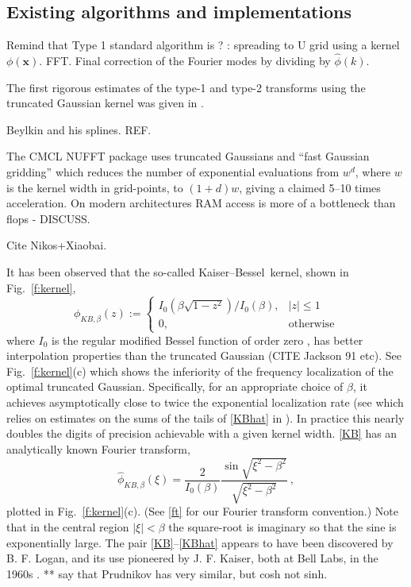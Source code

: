 \documentclass[10pt]{article}
\newcommand{\be}{\begin{equation}}
\newcommand{\ee}{\end{equation}}
\newcommand{\mbf}[1]{{\mathbf #1}}
\newcommand{\xx}{\mbf{x}}
\newcommand{\KB}{Kaiser--Bessel}
\newcommand{\freq}{\beta}          %
\begin{document}
\subsection{Existing algorithms and implementations}

Remind that Type 1 standard algorithm is ? :
spreading to U grid using a kernel $\phi(\xx)$.
FFT.
Final correction of the Fourier modes by dividing by
$\hat\phi(k)$.

The first rigorous estimates of the type-1 and type-2 transforms
using the truncated Gaussian kernel was given in \cite{dutt}.

Beylkin and his splines. REF.

The CMCL NUFFT package \cite{cmcl} uses truncated Gaussians
and ``fast Gaussian gridding'' \cite[Sec.~3]{nufft}
which reduces the number of exponential evaluations
from $w^d$, where $w$ is the kernel width in grid-points,
to $(1+d)w$, giving a claimed 5--10 times acceleration.
On modern architectures RAM access is more of a bottleneck than
flops - DISCUSS.

Cite Nikos+Xiaobai.

It has been observed that the so-called
\KB\ kernel, shown in Fig.~\ref{f:kernel},
\be
\phi_{KB,\freq}(z) := \left\{
\begin{array}{ll}I_0(\freq\sqrt{1-z^2}) / I_0(\freq), & |z|\le 1\\
  0,& \mbox{otherwise}\end{array}\right.
\label{KB}
\ee
where $I_0$ is the regular modified Bessel function of order zero
\cite[(10.25.2)]{dlmf}, has better interpolation
properties than the truncated Gaussian
(CITE Jackson 91 etc).
See Fig.~\ref{f:kernel}(c) which shows the inferiority of the
frequency localization of the optimal truncated Gaussian.
Specifically, for an appropriate choice of $\freq$, it achieves
asymptotically close to twice the exponential localization rate
(see \cite[p.19, (C.1) vs (C.4)]{nfft} which relies on
estimates on the sums of the tails of \eqref{KBhat}
in \cite{fourmontthesis,fourmont,pottshabil}).
In practice this nearly doubles the digits of precision achievable with
a given kernel width.
\eqref{KB} has an analytically known Fourier transform,
\be
\hat\phi_{KB,\freq}(\xi) = \frac{2}{I_0(\freq)}
\frac{\sin \sqrt{\xi^2-\freq^2}}{\sqrt{\xi^2-\freq^2}}
~,
\label{KBhat}
\ee
plotted in Fig.~\ref{f:kernel}(c).
(See \eqref{ft} for our Fourier transform convention.)
Note that in the central region $|\xi|<\freq$
the square-root is imaginary so that the sine is exponentially large.
The pair \eqref{KB}--\eqref{KBhat} appears to have been
discovered by B. F. Logan,
and its use pioneered by J. F. Kaiser, both at
Bell Labs, in the 1960s \cite{kaiser,kaiserinterview}.
** say that Prudnikov has very similar, but cosh not sinh.
\end{document}
